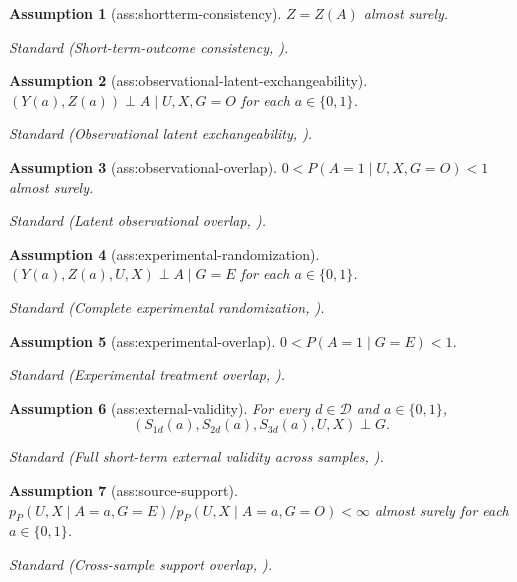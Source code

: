 \documentclass{article}
\newtheorem{assumption}{Assumption}
\begin{document}
\begin{assumption}[ass:shortterm-consistency]\label{ass:shortterm-consistency}
\(Z=Z(A)\) almost surely.
\par\smallskip\noindent\emph{Standard} (Short-term-outcome consistency, \cite{ImbensKallusMaoWang2025}).
\end{assumption}

\begin{assumption}[ass:observational-latent-exchangeability]\label{ass:observational-latent-exchangeability}
\((Y(a),Z(a))\perp A\mid U,X,G=O\) for each \(a\in\{0,1\}\).
\par\smallskip\noindent\emph{Standard} (Observational latent exchangeability, \cite{ImbensKallusMaoWang2025}).
\end{assumption}

\begin{assumption}[ass:observational-overlap]\label{ass:observational-overlap}
\(0<P(A=1\mid U,X,G=O)<1\) almost surely.
\par\smallskip\noindent\emph{Standard} (Latent observational overlap, \cite{ImbensKallusMaoWang2025}).
\end{assumption}

\begin{assumption}[ass:experimental-randomization]\label{ass:experimental-randomization}
\((Y(a),Z(a),U,X)\perp A\mid G=E\) for each \(a\in\{0,1\}\).
\par\smallskip\noindent\emph{Standard} (Complete experimental randomization, \cite{ImbensKallusMaoWang2025}).
\end{assumption}

\begin{assumption}[ass:experimental-overlap]\label{ass:experimental-overlap}
\(0<P(A=1\mid G=E)<1\).
\par\smallskip\noindent\emph{Standard} (Experimental treatment overlap, \cite{ImbensKallusMaoWang2025}).
\end{assumption}

\begin{assumption}[ass:external-validity]\label{ass:external-validity}
For every \(d\in\mathcal D\) and \(a\in\{0,1\}\),
\[
  (S_{1d}(a),S_{2d}(a),S_{3d}(a),U,X)\perp G.
\]
\par\smallskip\noindent\emph{Standard} (Full short-term external validity across samples, \cite{ImbensKallusMaoWang2025}).
\end{assumption}

\begin{assumption}[ass:source-support]\label{ass:source-support}
\(p_P(U,X\mid A=a,G=E)/p_P(U,X\mid A=a,G=O)<\infty\) almost surely for each \(a\in\{0,1\}\).
\par\smallskip\noindent\emph{Standard} (Cross-sample support overlap, \cite{ImbensKallusMaoWang2025}).
\end{assumption}
\end{document}
